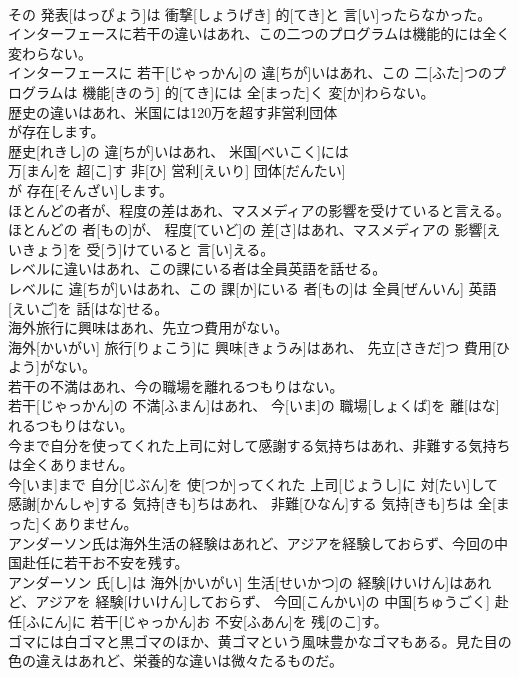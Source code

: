 \documentclass[8pt]{extreport}
\begin{document}
\begin{CJK}{UTF8}{min}
\\	その 発表[はっぴょう]は 衝撃[しょうげき] 的[てき]と 言[い]ったらなかった。
\\	インターフェースに若干の違いはあれ、この二つのプログラムは機能的には全く変わらない。	
\\	インターフェースに 若干[じゃっかん]の 違[ちが]いはあれ、この 二[ふた]つのプログラムは 機能[きのう] 的[てき]には 全[まった]く 変[か]わらない。
\\	歴史の違いはあれ、米国には120万を超す非営利団体
\\	が存在します。	
\\	歴史[れきし]の 違[ちが]いはあれ、 米国[べいこく]には 
\\	万[まん]を 超[こ]す 非[ひ] 営利[えいり] 団体[だんたい]
\\	が 存在[そんざい]します。
\\	ほとんどの者が、程度の差はあれ、マスメディアの影響を受けていると言える。	
\\	ほとんどの 者[もの]が、 程度[ていど]の 差[さ]はあれ、マスメディアの 影響[えいきょう]を 受[う]けていると 言[い]える。
\\	レベルに違いはあれ、この課にいる者は全員英語を話せる。	
\\	レベルに 違[ちが]いはあれ、この 課[か]にいる 者[もの]は 全員[ぜんいん] 英語[えいご]を 話[はな]せる。
\\	海外旅行に興味はあれ、先立つ費用がない。	
\\	海外[かいがい] 旅行[りょこう]に 興味[きょうみ]はあれ、 先立[さきだ]つ 費用[ひよう]がない。
\\	若干の不満はあれ、今の職場を離れるつもりはない。	
\\	若干[じゃっかん]の 不満[ふまん]はあれ、 今[いま]の 職場[しょくば]を 離[はな]れるつもりはない。
\\	今まで自分を使ってくれた上司に対して感謝する気持ちはあれ、非難する気持ちは全くありません。	
\\	今[いま]まで 自分[じぶん]を 使[つか]ってくれた 上司[じょうし]に 対[たい]して 感謝[かんしゃ]する 気持[きも]ちはあれ、 非難[ひなん]する 気持[きも]ちは 全[まった]くありません。
\\	アンダーソン氏は海外生活の経験はあれど、アジアを経験しておらず、今回の中国赴任に若干お不安を残す。	
\\	アンダーソン 氏[し]は 海外[かいがい] 生活[せいかつ]の 経験[けいけん]はあれど、アジアを 経験[けいけん]しておらず、 今回[こんかい]の 中国[ちゅうごく] 赴任[ふにん]に 若干[じゃっかん]お 不安[ふあん]を 残[のこ]す。
\\	ゴマには白ゴマと黒ゴマのほか、黄ゴマという風味豊かなゴマもある。見た目の色の違えはあれど、栄養的な違いは微々たるものだ。	

\end{CJK}
\end{document}
